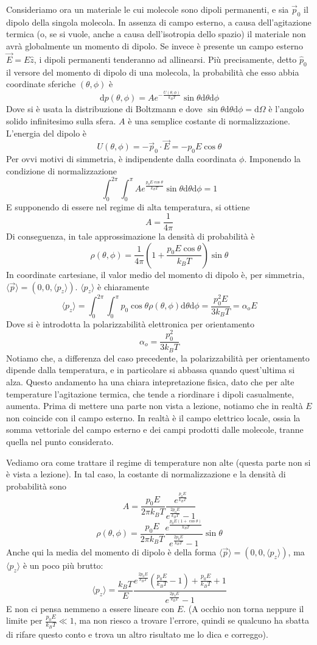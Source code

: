 \documentclass[a4paper,11pt]{book}
\newcommand{\dif}{\mathrm{d}}
\theoremstyle{definition}
\theoremstyle{theorem}
\begin{document}
Consideriamo ora un materiale le cui molecole sono dipoli permanenti, e sia $\vec{p}_0$ il dipolo della singola molecola. In assenza di campo esterno, a causa dell'agitazione termica (o, se si vuole, anche a causa dell'isotropia dello spazio) il materiale non avrà globalmente un momento di dipolo. Se invece è presente un campo esterno $\vec{E}=E\hat{z}$, i dipoli permanenti tenderanno ad allinearsi. Più precisamente, detto $\hat{p}_0$ il versore del momento di dipolo di una molecola, la probabilità che esso abbia coordinate sferiche $(\theta,\phi)$ è
\[\dif p(\theta,\phi)=Ae^{-\frac{U(\theta,\phi)}{k_BT}}\sin\theta\dif\theta\dif \phi\]
Dove si è usata la distribuzione di Boltzmann e dove $\sin\theta\dif\theta\dif\phi=\dif\Omega$ è l'angolo solido infinitesimo sulla sfera. $A$ è una semplice costante di normalizzazione. L'energia del dipolo è 
\[U(\theta,\phi)=-\vec{p}_0\cdot\vec{E}=-p_0E\cos\theta\]
Per ovvi motivi di simmetria, è indipendente dalla coordinata $\phi$. Imponendo la condizione di normalizzazione
\[\int_{0}^{2\pi}\int_{0}^{\pi}Ae^{\frac{p_0E\cos\theta}{k_BT}}\sin\theta\dif\theta\dif \phi=1\]
E supponendo di essere nel regime di alta temperatura, si ottiene
\[A=\frac{1}{4\pi}\]
Di conseguenza, in tale approssimazione la densità di probabilità è
\[\rho(\theta,\phi)=\frac{1}{4\pi}\left(1+\frac{p_0E\cos\theta}{k_BT}\right)\sin\theta\]
In coordinate cartesiane, il valor medio del momento di dipolo è, per simmetria, $\langle\vec{p}\rangle=\left(0,0,\langle p_z\rangle\right)$. $\langle p_z\rangle$ è chiaramente
\[\langle p_z\rangle=\int_{0}^{2\pi}\int_{0}^{\pi}p_0\cos\theta\rho(\theta,\phi)\dif\theta\dif\phi=\frac{p_0^2E}{3k_BT}=\alpha_oE\]
Dove si è introdotta la polarizzabilità elettronica per orientamento
\[\alpha_o=\frac{p_0^2}{3k_BT}\]
Notiamo che, a differenza del caso precedente, la polarizzabilità per orientamento dipende dalla temperatura, e in particolare si abbassa quando quest'ultima si alza. Questo andamento ha una chiara intepretazione fisica, dato che per alte temperature l'agitazione termica, che tende a riordinare i dipoli casualmente, aumenta. Prima di mettere una parte non vista a lezione, notiamo che in realtà $E$ non coincide con il campo esterno. In realtà è il campo elettrico locale, ossia la somma vettoriale del campo esterno e dei campi prodotti dalle molecole, tranne quella nel punto considerato.

Vediamo ora come trattare il regime di temperature non alte (questa parte non si è vista a lezione). In tal caso, la costante di normalizzazione e la densità di probabilità sono
\[A=\frac{p_0E}{2\pi k_BT}\frac{e^{\frac{p_0E}{k_BT}}}{e^{\frac{2p_0E}{k_BT}}-1}\]
\[\rho(\theta,\phi)=\frac{p_0E}{2\pi k_BT}\frac{e^{\frac{p_0E(1+\cos\theta)}{k_BT}}}{e^{\frac{2p_0E}{k_BT}}-1}\sin\theta\]
Anche qui la media del momento di dipolo è della forma $\langle\vec{p}\rangle=\left(0,0,\langle p_z\rangle\right)$, ma $\langle p_z\rangle$ è un poco più brutto:
\[\langle p_z\rangle=\frac{k_BT}{E}\frac{e^{\frac{2p_0E}{k_BT}}\left(\frac{p_0E}{k_BT}-1\right)+\frac{p_0E}{k_BT}+1}{e^{\frac{2p_0E}{k_BT}}-1}\]
E non ci pensa nemmeno a essere lineare con $E$. (A occhio non torna neppure il limite per $\frac{p_0E}{k_BT}\ll1$, ma non riesco a trovare l'errore, quindi se qualcuno ha sbatta di rifare questo conto e trova un altro risultato me lo dica e correggo).
\end{document}
